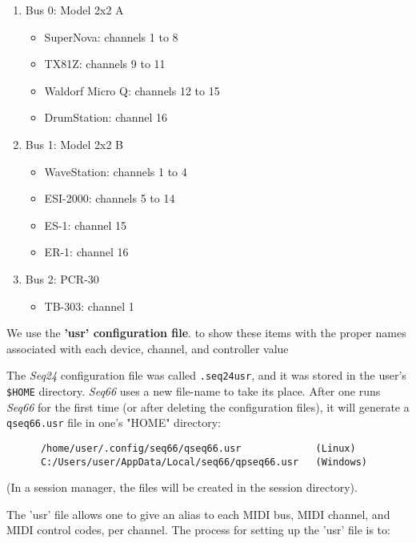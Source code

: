    \begin{enumerate}
      \item Bus 0: Model 2x2 A
      \begin{itemize}
         \item SuperNova: channels 1 to 8
         \item TX81Z: channels 9 to 11
         \item Waldorf Micro Q: channels 12 to 15
         \item DrumStation: channel 16
      \end{itemize}
      \item Bus 1: Model 2x2 B
      \begin{itemize}
         \item WaveStation: channels 1 to 4
         \item ESI-2000: channels 5 to 14
         \item ES-1: channel 15
         \item ER-1: channel 16
      \end{itemize}
      \item Bus 2: PCR-30
      \begin{itemize}
         \item TB-303: channel 1
      \end{itemize}
   \end{enumerate}

   We use the \textbf{'usr' configuration file}.
   to show these items with the proper
   names associated with each device, channel, and controller value

   The \textsl{Seq24} configuration file was called
   \texttt{.seq24usr}, and it was stored in the user's \texttt{\$HOME}
   directory.
   \textsl{Seq66} uses a new file-name
   to take its place.
   After one runs \textsl{Seq66} for the first time (or after deleting
   the configuration files), it will generate a
   \texttt{qseq66.usr} file in one's "HOME" directory:

   \begin{verbatim}
      /home/user/.config/seq66/qseq66.usr             (Linux)
      C:/Users/user/AppData/Local/seq66/qpseq66.usr   (Windows)
   \end{verbatim}

   (In a session manager, the files will be created in the session directory).

   The 'usr' file allows one to give an alias to 
   each MIDI bus, MIDI channel, and MIDI control 
   codes, per channel.
   The process for setting up the 'usr' file is to:

